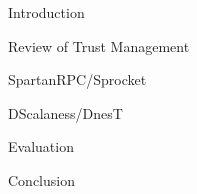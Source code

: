 \centerline{}
\stopslide


\begin{cenumerate}
\item Introduction
\item Review of Trust Management
\item SpartanRPC/Sprocket
\item DScalaness/DnesT
\item {}
\item Evaluation
\item Conclusion
\end{cenumerate}
\stopslide


